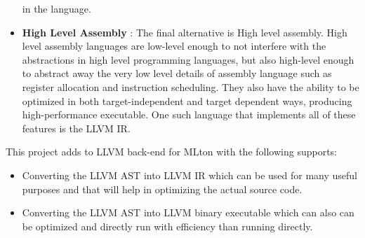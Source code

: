 \documentclass[openany]{book}
\begin{document}
\begin{itemize}
		in the language.
		\item \textbf{High Level Assembly} : The final alternative is High level assembly.  High level assembly languages are
		low-level enough to not interfere with the abstractions in high level programming languages,  but  also  high-level  enough  to  abstract  away  the  very  low  level  details
		of assembly language such as register allocation and instruction scheduling.  They also have the ability to be optimized in both target-independent and target dependent
		ways, producing high-performance executable. One such language that implements all of these features is the LLVM IR.
	\end{itemize}
    
    
    This project adds to LLVM back-end for MLton with the following supports:
	\begin{itemize}
		\item Converting the LLVM AST into LLVM IR which can be used for many useful purposes and that will help in optimizing the actual source code.
		\item Converting the LLVM AST into LLVM binary executable  which can also can be optimized and directly run with efficiency than running directly.
	\end{itemize}
	 
\end{document}
